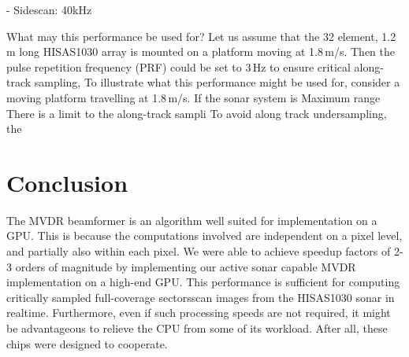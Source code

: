 \documentclass[12pt,journal,captionsoff,onecolumn]{IEEEtran}
\newcommand\1{\vec 1}
\begin{document}
- Sidescan: 40kHz 

What may this performance be used for? Let us assume that the 32 element, 1.2\,m long HISAS1030 array is mounted on a platform moving at 1.8\,m/s. Then the pulse repetition frequency (PRF) could be set to 3\,Hz to ensure critical along-track sampling, 
To illustrate what this performance might be used for, consider a moving platform travelling at 1.8\,m/s. 
If the sonar system is Maximum range 
There is a limit to the along-track sampli
To avoid along track undersampling, the 

% 
% 
% 


\section{Conclusion}

The \gls{MVDR} beamformer is an algorithm well suited for implementation on a \gls{GPU}. This is because the computations involved are independent on a pixel level, and partially also within each pixel. We were able to achieve speedup factors of 2-3 orders of magnitude by implementing our active sonar capable \gls{MVDR} implementation on a high-end \gls{GPU}. This performance is sufficient for computing critically sampled full-coverage sectorsscan images from the HISAS1030 sonar in realtime. Furthermore, even if such processing speeds are not required, it might be advantageous to relieve the \gls{CPU} from some of its workload. After all, these chips were designed to cooperate.


\end{document}
